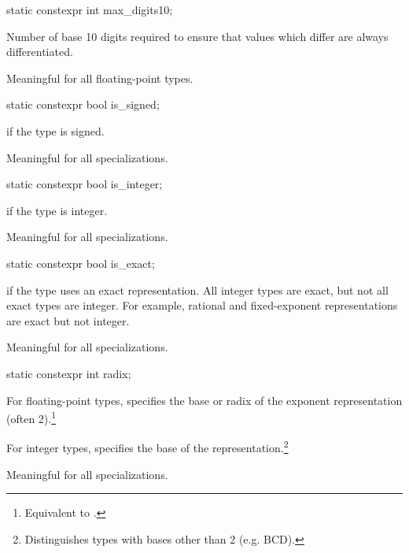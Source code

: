 %
\begin{itemdecl}
static constexpr int max_digits10;
\end{itemdecl}

\begin{itemdescr}
\pnum
Number of base 10 digits required to ensure that values which
differ are always differentiated.

\pnum
Meaningful for all floating-point types.
\end{itemdescr}

%
\begin{itemdecl}
static constexpr bool is_signed;
\end{itemdecl}

\begin{itemdescr}
\pnum
{} if the type is signed.

\pnum
Meaningful for all specializations.
\end{itemdescr}

%
\begin{itemdecl}
static constexpr bool is_integer;
\end{itemdecl}

\begin{itemdescr}
\pnum
{} if the type is integer.

\pnum
Meaningful for all specializations.
\end{itemdescr}

%
\begin{itemdecl}
static constexpr bool is_exact;
\end{itemdecl}

\begin{itemdescr}
\pnum
{} if the type uses an exact representation.
All integer types are exact, but not all exact types are integer.
For example, rational and fixed-exponent representations are exact but not integer.

\pnum
Meaningful for all specializations.
\end{itemdescr}

%
\begin{itemdecl}
static constexpr int radix;
\end{itemdecl}

\begin{itemdescr}
\pnum
For floating-point types, specifies the base or radix of the exponent representation
(often 2).\footnote{Equivalent to .}

\pnum
For integer types, specifies the base of the
representation.\footnote{Distinguishes types with bases other than 2 (e.g.
BCD).}

\pnum
Meaningful for all specializations.
\end{itemdescr}

